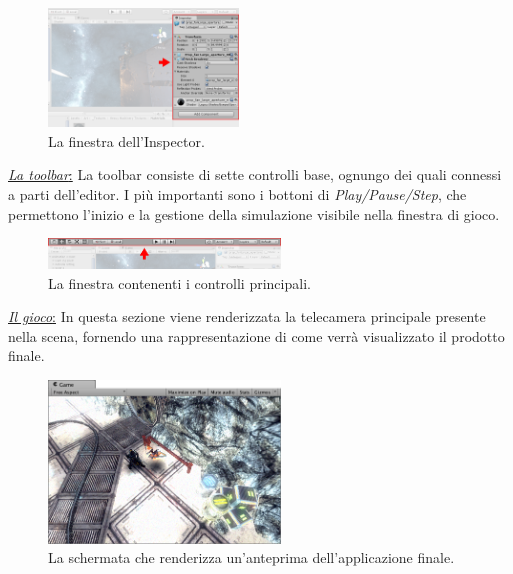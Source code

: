 \begin{figure}[H]
	\includegraphics[width=0.45\textwidth]{figure/Inspector}
	\centering
	\caption{La finestra dell'Inspector.}
\end{figure}

\newpage

\begin{flushleft}
	\underline{\textit{La toolbar}:}
	La toolbar consiste di sette controlli base, ognungo dei quali connessi a parti dell'editor. I più importanti sono i bottoni di \textit{Play/Pause/Step}, che permettono l'inizio e la gestione della simulazione visibile nella finestra di gioco. 
	
\end{flushleft}

\begin{figure}[H]
	\includegraphics[width=0.55\textwidth]{figure/Toolbar}
	\centering
	\caption{La finestra contenenti i controlli principali.}
\end{figure}

\begin{flushleft}
	\underline{\textit{Il gioco}:}
	In questa sezione viene renderizzata la telecamera principale presente nella scena, fornendo una rappresentazione di come verrà visualizzato il prodotto finale.
\end{flushleft}

\begin{figure}[H]
	\includegraphics[width=0.55\textwidth]{figure/GameView}
	\centering
	\caption{La schermata che renderizza un'anteprima dell'applicazione finale.}
\end{figure}


